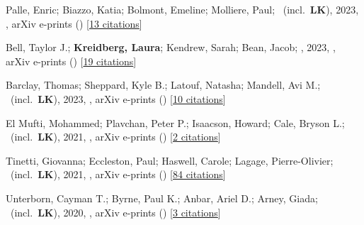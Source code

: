 \item[{\color{numcolor}\scriptsize15}] Palle, Enric; Biazzo, Katia; Bolmont, Emeline; Molliere, Paul; \etal\ (incl.\ \textbf{LK}), 2023, , arXiv e-prints () [\href{https://ui.adsabs.harvard.edu/abs/2023arXiv231117075P}{13 citations}]

\item[{\color{numcolor}\scriptsize14}] Bell, Taylor J.; \textbf{Kreidberg, Laura}; Kendrew, Sarah; Bean, Jacob; \etal, 2023, , arXiv e-prints () [\href{https://ui.adsabs.harvard.edu/abs/2023arXiv230106350B}{19 citations}]

\item[{\color{numcolor}\scriptsize13}] Barclay, Thomas; Sheppard, Kyle B.; Latouf, Natasha; Mandell, Avi M.; \etal\ (incl.\ \textbf{LK}), 2023, , arXiv e-prints () [\href{https://ui.adsabs.harvard.edu/abs/2023arXiv230110866B}{10 citations}]

\item[{\color{numcolor}\scriptsize12}] El Mufti, Mohammed; Plavchan, Peter P.; Isaacson, Howard; Cale, Bryson L.; \etal\ (incl.\ \textbf{LK}), 2021, , arXiv e-prints () [\href{https://ui.adsabs.harvard.edu/abs/2021arXiv211213448E}{2 citations}]

\item[{\color{numcolor}\scriptsize11}] Tinetti, Giovanna; Eccleston, Paul; Haswell, Carole; Lagage, Pierre-Olivier; \etal\ (incl.\ \textbf{LK}), 2021, , arXiv e-prints () [\href{https://ui.adsabs.harvard.edu/abs/2021arXiv210404824T}{84 citations}]

\item[{\color{numcolor}\scriptsize10}] Unterborn, Cayman T.; Byrne, Paul K.; Anbar, Ariel D.; Arney, Giada; \etal\ (incl.\ \textbf{LK}), 2020, , arXiv e-prints () [\href{https://ui.adsabs.harvard.edu/abs/2020arXiv200708665U}{3 citations}]

